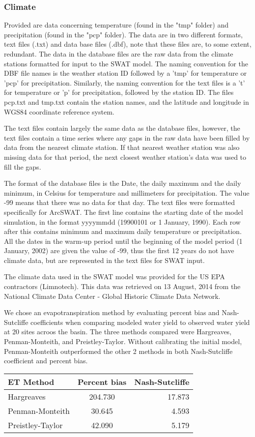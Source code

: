 \subsubsection{Climate}	

Provided are data concerning temperature (found in the "tmp" folder) and precipitation	(found in the "pcp" folder). The data are in two different formats, text files (.txt) and data base files (.dbf),	note that these files are, to some extent, redundant. The data in the database files are the raw data from the climate stations formatted for input to the SWAT model. The naming convention for the DBF file names is the weather station ID followed by a 'tmp' for temperature or 'pcp' for precipitation.	Similarly, the naming convention for the text files is a 't' for temperature or 'p' for precipitation, followed by the station ID. The files pcp.txt and tmp.txt contain the station names, and the latitude and longitude in WGS84 coordinate reference system.

The text files contain largely the same data as the database files, however, the text files contain a time series where any gaps in the raw data have been filled by data from the nearest climate station. If that nearest weather station was also missing data for that period, the next closest weather station's data was used to fill the gaps. 

The format of the database files is the Date, the daily maximum and the daily minimum, in Celsius for temperature and millimeters for precipitation. The value -99 means that there was no data for that day. The text files were formatted specifically for ArcSWAT. The first line contains the starting date of the model simulation, in the format yyyymmdd (19900101 or 1 January, 1990). Each row after this contains minimum and maximum daily temperature or precipitation. All the dates in the warm-up period until the beginning of the model period (1 January, 2002) are given the value of -99, thus the first 12 years do not have climate data, but are represented in the text files for SWAT input. 

The climate data used in the SWAT model was provided for the US EPA contractors (Limnotech). This data was retrieved on 13 August, 2014 from the National Climate Data Center - Global Historic Climate Data Network.

We chose an evapotranspiration method by evaluating percent bias and Nash-Sutcliffe coefficients when comparing modeled water yield to observed water yield at 20 sites acroos the basin. The three methods compared were Hargreaves, Penman-Monteith, and Preistley-Taylor. Without calibrating the initial model, Penman-Monteith outperformed the other 2 methods in both Nash-Sutcliffe coefficient and percent bias. 

\begin{tabular}{ l c r }
ET Method         &	Percent bias & Nash-Sutcliffe \\
\hline	\hline
Hargreaves        &	204.730	& 	17.873	\\
Penman-Monteith	  &	30.645	&	4.593 	\\
Preistley-Taylor  &	42.090	&	5.179 	\\
\end{tabular}
